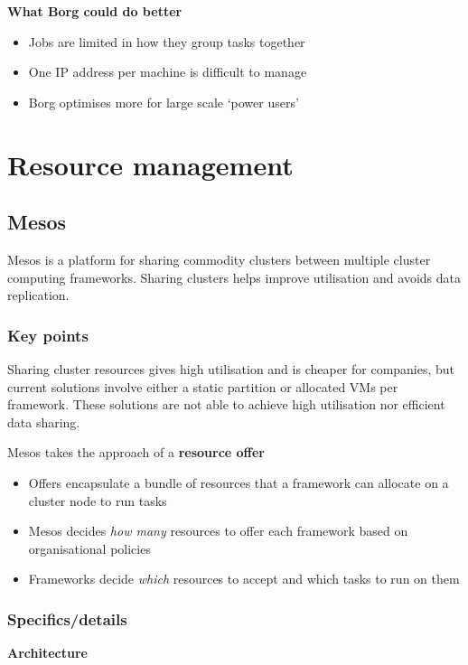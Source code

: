 \documentclass{sty/SizheArticle}
\begin{document}
\textbf{What Borg could do better}
\begin{itemize}
\item Jobs are limited in how they group tasks together
\item One IP address per machine is difficult to manage
\item Borg optimises more for large scale `power users'
\end{itemize}



\section{Resource management}
\subsection{Mesos}
Mesos is a platform for sharing commodity clusters between multiple cluster
computing frameworks. Sharing clusters helps improve utilisation
and avoids data replication.

\subsubsection{Key points}
Sharing cluster resources gives high utilisation and is cheaper for
companies, but current solutions involve either a static partition or
allocated VMs per framework. These solutions are not able to achieve high
utilisation nor efficient data sharing.

Mesos takes the approach of a \textbf{resource offer}
\begin{itemize}
\item Offers encapsulate a bundle of resources that a framework can allocate
on a cluster node to run tasks
\item Mesos decides \textit{how many} resources to offer each framework based
on organisational policies
\item Frameworks decide \textit{which} resources to accept and which tasks to
run on them
\end{itemize}


\subsubsection{Specifics/details}
\textbf{Architecture}
\end{document}
